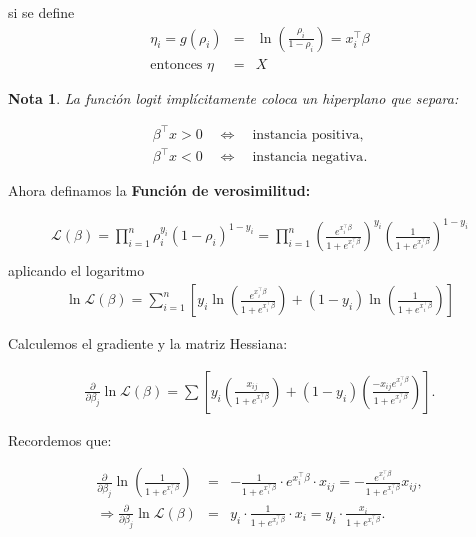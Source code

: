 \documentclass[12pt]{article}
\newtheorem{Note}{Nota}%
\begin{document}
si se define
\begin{eqnarray*}
\eta_i = g(\rho_i) &=& \ln \left( \frac{\rho_i}{1 - \rho_i} \right) = x_i^\top \beta\\
\textrm{entonces }\eta &=& X 
\end{eqnarray*}

\begin{Note}
La función \textit{logit} implícitamente coloca un hiperplano que separa:
\end{Note}

\begin{eqnarray*}
\beta^\top x > 0 \quad \Longleftrightarrow \quad \text{instancia positiva},\\
\beta^\top x < 0 \quad \Longleftrightarrow \quad \text{instancia negativa}.
\end{eqnarray*}

\noindent Ahora definamos la \textbf{Función de verosimilitud:}

\begin{eqnarray*}
\mathcal{L}(\beta) =\prod_{i=1}^{n} \rho_i^{y_i} (1 - \rho_i)^{1 - y_i}
= \prod_{i=1}^{n} \left( \frac{e^{x_i^\top \beta}}{1 + e^{x_i^\top \beta}} \right)^{y_i}
\left( \frac{1}{1 + e^{x_i^\top \beta}} \right)^{1 - y_i}\\
\end{eqnarray*}
aplicando el logaritmo
\begin{eqnarray*}
\ln \mathcal{L}(\beta) =\sum_{i=1}^{n} \left[y_i \ln \left( \frac{e^{x_i^\top \beta}}{1 + e^{x_i^\top \beta}} \right) + (1 - y_i) \ln \left( \frac{1}{1 + e^{x_i^\top \beta}} \right)\right]
\end{eqnarray*}

Calculemos  el gradiente y la matriz Hessiana:

\begin{eqnarray*}
\frac{\partial}{\partial \beta_j} \ln \mathcal{L}(\beta)
= \sum \left[ y_i \left( \frac{x_{ij}}{1 + e^{x_i^\top \beta}} \right)
+ (1 - y_i) \left( \frac{-x_{ij} e^{x_i^\top \beta}}{1 + e^{x_i^\top \beta}} \right) \right].
\end{eqnarray*}


Recordemos que:

\begin{eqnarray*}
\frac{\partial}{\partial \beta_j} \ln \left( \frac{1}{1 + e^{x_i^\top \beta}} \right)
&=& - \frac{1}{1 + e^{x_i^\top \beta}} \cdot e^{x_i^\top \beta} \cdot x_{ij}
= - \frac{e^{x_i^\top \beta}}{1 + e^{x_i^\top \beta}} x_{ij},\\
\Rightarrow \frac{\partial}{\partial \beta_j} \ln \mathcal{L}(\beta)
&=& y_i \cdot \frac{1}{1 + e^{x_i^\top \beta}} \cdot x_i
= y_i \cdot \frac{x_i}{1 + e^{x_i^\top \beta}}.
\end{eqnarray*}
\end{document}
